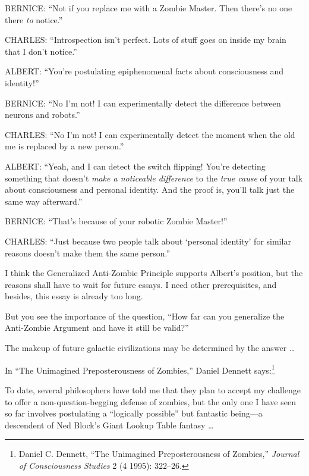 {
 BERNICE: ``Not if you replace me with a Zombie
Master. Then there's no one there \textit{to}
notice.''}

{
 CHARLES: ``Introspection isn't
perfect. Lots of stuff goes on inside my brain that I
don't notice.''}

{
 ALBERT: ``You're postulating
epiphenomenal facts about consciousness and
identity!''}

{
 BERNICE: ``No I'm not! I can
experimentally detect the difference between neurons and
robots.''}

{
 CHARLES: ``No I'm not! I can
experimentally detect the moment when the old me is replaced by a new
person.''}

{
 ALBERT: ``Yeah, and I can detect the switch
flipping! You're detecting something that
doesn't \textit{make a noticeable difference} to the
\textit{true cause} of your talk about consciousness and personal
identity. And the proof is, you'll talk just the same
way afterward.''}

{
 BERNICE: ``That's because of your
robotic Zombie Master!''}

{
 CHARLES: ``Just because two people talk about
`personal identity' for similar reasons
doesn't make them the same person.''}

{
 I think the Generalized Anti-Zombie Principle supports
Albert's position, but the reasons shall have to wait
for future essays. I need other prerequisites, and besides, this essay
is already too long.}

{
 But you see the importance of the question, ``How
far can you generalize the Anti-Zombie Argument and have it still be
valid?''}

{
 The makeup of future galactic civilizations may be determined by
the answer \ldots}

\myendsectiontext


\bigskip


{
 In ``The Unimagined Preposterousness of
Zombies,'' Daniel Dennett says:\footnote{Daniel C. Dennett, ``The Unimagined
Preposterousness of Zombies,'' \textit{Journal of
Consciousness Studies} 2 (4 1995): 322--26.}}

{
 To date, several philosophers have told me that they plan to
accept my challenge to offer a non-question-begging defense of zombies,
but the only one I have seen so far involves postulating a
``logically possible'' but fantastic
being---a descendent of Ned Block's Giant Lookup Table
fantasy \ldots}

